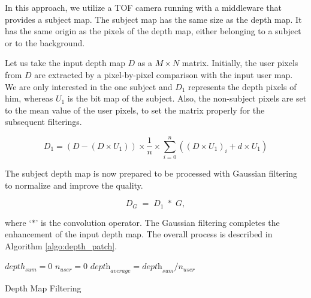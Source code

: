 \documentclass[number,preprint,review,12pt]{elsarticle}
\begin{document}
In this approach, we utilize a TOF camera running with a middleware that provides a subject map. The subject map has the same size as the depth map. It has the same origin as the pixels of the depth map, either belonging to a subject or to the background.

Let us take the input depth map $D$ as a $M \times N$ matrix. Initially, the user pixels from $D$ are extracted by a pixel-by-pixel comparison with the input user map. We are only interested in the one subject and $D_1$ represents the depth pixels of him, whereas $U_1$ is the bit map of the subject. Also, the non-subject pixels are set to the mean value of the user pixels, to set the matrix properly for the subsequent filterings.

\begin{equation}
D_1=(D-(D \times U_1 )) \times \frac{1}{n} \times \sum\limits_{i=0}^n \left(\left(D \times U_1 \right)_i + d \times U_1 \right)
\label{eqn:patch_depth}
\end{equation}

The subject depth map is now prepared to be processed with Gaussian filtering to normalize and improve the quality. 

\begin{equation}
D_G\;=\;D_1\;*\;G, 
\label{eqn:gaussian_convolution}
\end{equation}

\noindent where `$*$' is the convolution operator. The Gaussian filtering completes the enhancement of the input depth map. 
The overall process is described in Algorithm \ref{algo:depth_patch}.

\singlespacing

\begin{algorithm}
\DontPrintSemicolon 
{}
$depth_{sum}=0$ \;
$n_{user} =0$\;
$\textit{depth}_\textit{average}=\textit{depth}_\textit{sum}/n_\textit{user}$ \;
 
\caption{Depth Map Filtering}
\label{algo:depth_patch}
\end{algorithm}
\end{document}
